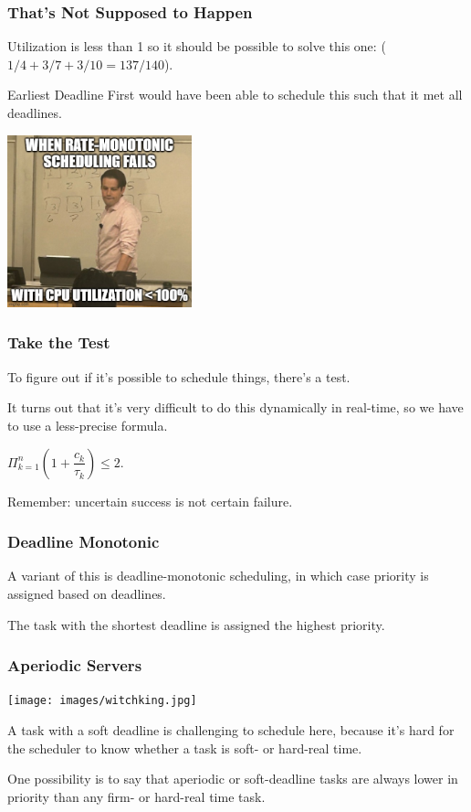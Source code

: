 \begin{frame}
\frametitle{That's Not Supposed to Happen}


Utilization is less than 1 so it should be possible to solve this one: ($1/4 + 3/7 + 3/10 = 137/140$). 

Earliest Deadline First would have been able to schedule this such that it met all deadlines. 

\begin{center}
	\includegraphics[width=0.4\textwidth]{images/rate-monotonic.jpg}
\end{center}

\end{frame}

\begin{frame}
\frametitle{Take the Test}

To figure out if it's possible to schedule things, there's a test. 

It turns out that it's very difficult to do this dynamically in real-time, so we have to use a less-precise formula.

\begin{center}
	$\Pi^{n}_{k=1}( 1 + \dfrac{c_k}{\tau _k}) \leq 2$.
\end{center}

Remember: uncertain success is not certain failure.

\end{frame}

\begin{frame}
\frametitle{Deadline Monotonic}

A variant of this is deadline-monotonic scheduling, in which case priority is assigned based on deadlines.

The task with the shortest deadline is assigned the highest priority.

\end{frame}

\begin{frame}
\frametitle{Aperiodic Servers}

\begin{center}
	\texttt{[image: images/witchking.jpg]}
\end{center}

A task with a soft deadline is challenging to schedule here, because it's hard for the scheduler to know whether a task is soft- or hard-real time.

One possibility is to say that aperiodic or soft-deadline tasks are always lower in priority than any firm- or hard-real time task.

\end{frame}

